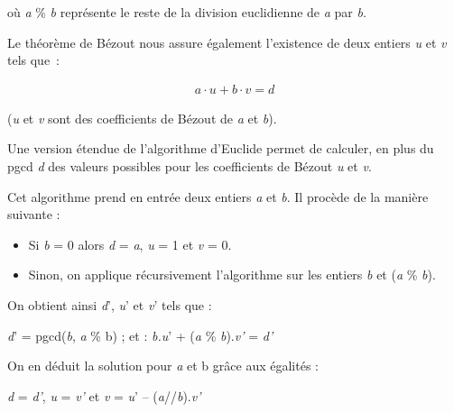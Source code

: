 où \emph{a} \% \emph{b} représente le reste de la division euclidienne
de \emph{a} par \emph{b}.
\fi

  


\ifprof
\else
Le théorème de Bézout nous assure également l'existence de deux entiers
\emph{u} et \emph{v} tels que~:

\begin{align*}
a\cdot u+b\cdot v=d
\end{align*}

(\emph{u} et \emph{v} sont des
coefficients de Bézout de \emph{a} et \emph{b}).

Une version étendue de l'algorithme d'Euclide permet de calculer, en
plus du pgcd \emph{d} des valeurs possibles pour les coefficients de
Bézout \emph{u} et \emph{v}.

Cet algorithme prend en entrée deux entiers \emph{a} et \emph{b}. Il
procède de la manière suivante :

\begin{itemize}
\item
  Si \emph{b} = 0 alors \emph{d} = \emph{a}, \emph{u} = 1 et \emph{v} =
  0.
\item
  Sinon, on applique récursivement l'algorithme sur les entiers \emph{b}
  et (\emph{a} \% \emph{b}).
\end{itemize}

On obtient ainsi \emph{d}', \emph{u}' et \emph{v}' tels que :

\emph{d}' = pgcd(\emph{b}, \emph{a} \% b) ; et : \emph{b.u}' + (\emph{a}
\% \emph{b}).\emph{v'} = \emph{d'}

On en déduit la solution pour \emph{a} et b grâce aux égalités :

\emph{d} = \emph{d'}, \emph{u} = \emph{v'} et \emph{v} = \emph{u}' --
(\emph{a}//\emph{b}).\emph{v'}
\fi

  
  
